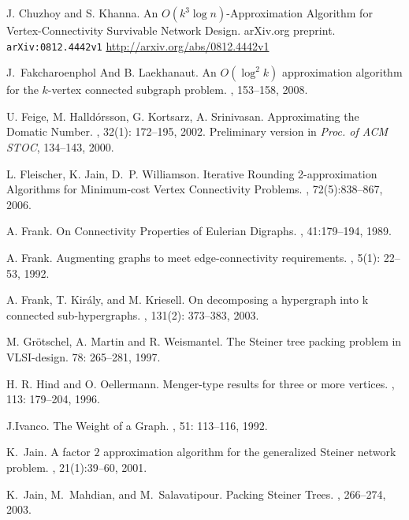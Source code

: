 \documentclass[11pt]{article}
\begin{document}
\begin{thebibliography}{55}
J. Chuzhoy and S. Khanna.
\newblock An $O(k^3 \log n)$-Approximation Algorithm for
Vertex-Connectivity Survivable Network Design.
\newblock arXiv.org preprint. {\tt arXiv:0812.4442v1}
\url{http://arxiv.org/abs/0812.4442v1}

J.~Fakcharoenphol And B. Laekhanaut.
\newblock An $O(\log^2 k)$ approximation algorithm for the
$k$-vertex connected subgraph problem.
, 153--158, 2008. 

U. Feige, M. Halld\'{o}rsson, G. Kortsarz, A. Srinivasan.
\newblock Approximating the Domatic Number.
, 32(1): 172--195, 2002.
\newblock Preliminary version in {\em Proc. of ACM STOC}, 134--143, 2000.

L. Fleischer, K. Jain, D.~P. Williamson.
\newblock Iterative Rounding 2-approximation Algorithms for Minimum-cost Vertex
Connectivity Problems.
, 72(5):838--867, 2006.

A. Frank.
\newblock On Connectivity Properties of Eulerian Digraphs.
, 41:179--194, 1989.

A. Frank.
\newblock Augmenting graphs to meet edge-connectivity requirements.
, 5(1): 22--53, 1992.

A. Frank, T. Kir\'{a}ly, and M. Kriesell.
\newblock On decomposing a hypergraph into k connected sub-hypergraphs. 
, 131(2): 373--383, 2003. 


M. Gr\"{o}tschel, A. Martin and R. Weismantel.
\newblock The Steiner tree packing problem in VLSI-design.
 78: 265--281, 1997.

H. R. Hind and O. Oellermann.
\newblock Menger-type results for three or more vertices.
, 113: 179--204, 1996.

J.Ivanco.
\newblock The Weight of a Graph.
, 51: 113--116, 1992.

K.~Jain.
\newblock A factor $2$ approximation algorithm for the generalized Steiner 
  network problem.
, 21(1):39--60, 
  2001.

K.~Jain, M.~Mahdian, and M.~Salavatipour.
\newblock Packing Steiner Trees.
, 266--274, 2003.


\end{thebibliography}
\end{document}
